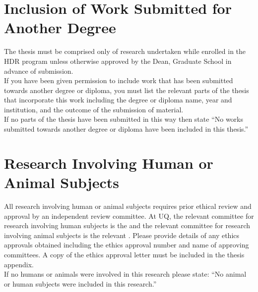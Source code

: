 



\section*{Inclusion of Work Submitted for Another Degree}

\begin{instructional}


    The thesis must be comprised only of research undertaken while enrolled in the HDR program unless otherwise approved by the Dean, Graduate School in advance of submission.\\
    
    \noindent
    If you have been given permission to include work that has been submitted towards another degree or diploma, you must list the relevant parts of the thesis that incorporate this work including the degree or diploma name, year and institution, and the outcome of the submission of material. \\
    
    \noindent
    If no parts of the thesis have been submitted in this way then state ``No works submitted towards another degree or diploma have been included in this thesis.''
    
\end{instructional}





\section*{Research Involving Human or Animal Subjects}

\begin{instructional}
	All research involving human or animal subjects requires prior ethical review and approval by an independent review committee. At UQ, the relevant committee for research involving human subjects is the \href{http://www.uq.edu.au/research/integrity-compliance/human-ethics}{\color{blue}{Human Ethics Unit}} and the relevant committee for research involving animal subjects is the relevant \href{http://www.uq.edu.au/research/integrity-compliance/animal-welfare}{\color{blue}{Animal Ethics Committee}}.  Please provide details of any ethics approvals obtained including the ethics approval number and name of approving committees. A copy of the ethics approval letter must be included in the thesis appendix.\\
    
    \noindent
	If no humans or animals were involved in this research please state: ``No animal or human subjects were included in this research.''
\end{instructional}

